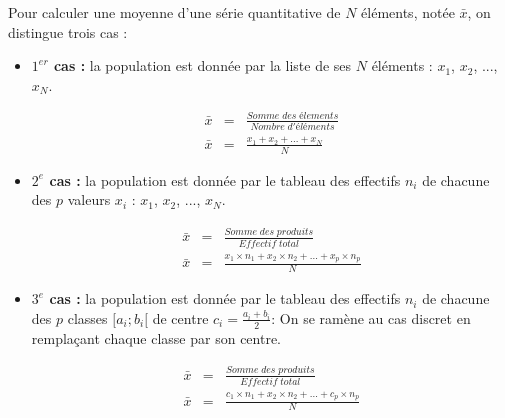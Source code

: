 \documentclass[12pt,a4paper]{article}
\begin{document}
  	\begin{mybilan}
  		  		
  		Pour calculer une moyenne d'une série quantitative de $N$ éléments, notée $\bar{x}$, on distingue trois cas :
  		
  		\begin{itemize}
  			\item \textbf{$1^{er}$ cas :} la population est donnée par la liste de ses $N$ éléments : $x_1$, $x_2$, ..., $x_N$.
  			
  			\begin{eqnarray*}
  				\bar{x} &= & \frac{Somme\; des \; élements}{Nombre\; d'éléments}\\
  				\bar{x} &= & \frac{x_1 + x_2 + ... + x_N}{N}
  			\end{eqnarray*}
  		
  			\item \textbf{$2^{e}$ cas :} la population est donnée par le tableau des effectifs $n_i$ de chacune des $p$ valeurs $x_i$ : $x_1$, $x_2$, ..., $x_N$.
  			
  			\begin{eqnarray*}
  				\bar{x} &= & \frac{Somme\; des \; produits}{Effectif\; total}\\
  				\bar{x} &= & \frac{x_1 \times n_1 + x_2 \times n_2 + ... + x_p \times n_p}{N}
  			\end{eqnarray*}
  		
  			\item \textbf{$3^{e}$ cas :} la population est donnée par le tableau des effectifs $n_i$ de chacune des $p$ classes $[a_i; b_i[$ de centre $c_i = \frac{a_i +  b_i}{2} $: On se ramène au cas discret en remplaçant chaque classe par son centre.
  			
  			\begin{eqnarray*}
  				\bar{x} &= & \frac{Somme\; des \; produits}{Effectif\; total}\\
  				\bar{x} &= & \frac{c_1 \times n _1 + x_2 \times n_2 + ... + c_p \times n_p}{N}
  			\end{eqnarray*}
  		
  		\end{itemize}
  	\end{mybilan}
\end{document}

